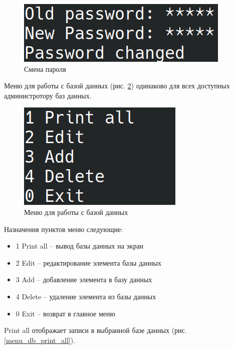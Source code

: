 \begin{figure}[H]
    \centering
    \includegraphics[width=0.7\linewidth]{photo/interface/password_change}
    \caption{Смена пароля}
    \label{password_change}
\end{figure}

Меню для работы с базой данных (рис. \ref{menu_db}) одинаково 
для всех доступных администротору баз данных.

\begin{figure}[H]
    \centering
    \includegraphics[width=0.7\linewidth]{photo/interface/menu_db}
    \caption{Меню для работы с базой данных}
    \label{menu_db}
\end{figure}

Назначения пунктов меню следующие:

\begin{itemize}
    \item 1 Print all -- вывод базы данных на экран
    \item 2 Edit -- редактирование элемента базы данных
    \item 3 Add -- добавление элемента в базу данных
    \item 4 Delete -- удаление элемента из базы данных
    \item 0 Exit -- возврат в главное меню
\end{itemize}

Print all отображает записи в выбранной базе данных (рис. \ref{menu_db_print_all}).

